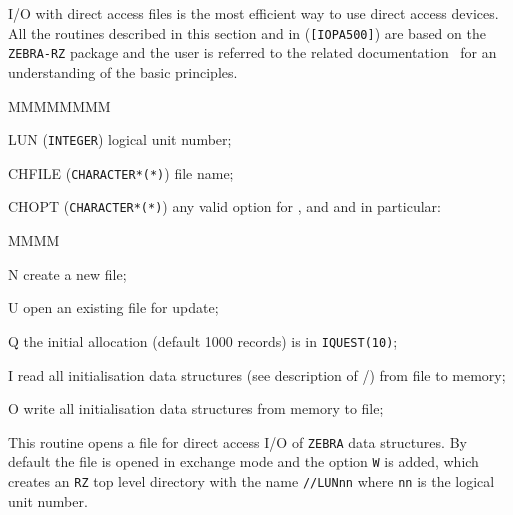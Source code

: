         
        

I/O with direct access files is the most efficient way to use direct
access devices. All the routines described in this section and in
({\tt [IOPA500]}) are based on the {\tt ZEBRA-RZ} package and the
user is referred to the related documentation~\cite{bib-ZEBRA}
for an understanding of the basic principles.

\begin{DLtt}{MMMMMMMM}
\item[LUN] ({\tt INTEGER}) logical unit number;
\item[CHFILE] ({\tt CHARACTER*(*)}) file name;
\item[CHOPT] ({\tt CHARACTER*(*)}) any valid option for ,
 and  and in particular:
\begin{DLtt}{MMMM}
\item[N] create a new file;
\item[U] open an existing file for update;
\item[Q] the initial allocation (default 1000 records)
is in {\tt IQUEST(10)};
\item[I] read all initialisation data structures (see description of 
/) from file to memory;
\item[O] write all initialisation data structures from memory to file;
\end{DLtt}
\end{DLtt}

This routine opens a file for direct access I/O of {\tt ZEBRA} data
structures. By default the file is opened in exchange mode and the option
{\tt W} is added, which creates an {\tt RZ} top level directory with the
name {\tt //LUNnn} where {\tt nn} is the logical unit number.

